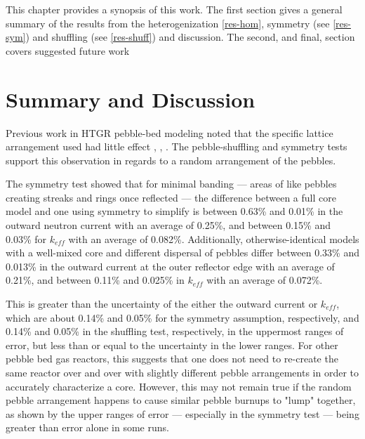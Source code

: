 This chapter provides a synopsis of this work.  The first section gives a general summary of the results from the heterogenization \autoref{res-hom}, symmetry (see \autoref{res-sym}) and shuffling (see \autoref{res-shuff}) and discussion.  The second, and final, section covers suggested future work

\section{Summary and Discussion}

Previous work in HTGR pebble-bed modeling noted that the specific lattice arrangement used had little effect \cite{turkmen_effect_2012}, \cite{karriem_mcnp_2001}, \cite{brown_stochastic_2005}.  The pebble-shuffling and symmetry tests support this observation in regards to a  random arrangement of the pebbles.

The symmetry test showed that for minimal banding --- areas of like pebbles creating streaks and rings once reflected --- the difference between a full core model and one using symmetry to simplify is between 0.63\% and 0.01\% in the outward neutron current with an average of 0.25\%, and between 0.15\% and 0.03\% for $k_{eff}$ with an average of 0.082\%.  Additionally, otherwise-identical models with a well-mixed core and different dispersal of pebbles differ between 0.33\% and 0.013\% in the outward current at the outer reflector edge with an average of 0.21\%, and between 0.11\% and 0.025\% in $k_{eff}$ with an average of 0.072\%.  

This is greater than the uncertainty of the either the outward current or $k_{eff}$, which are about 0.14\% and 0.05\% for the symmetry assumption, respectively, and 0.14\% and 0.05\% in the shuffling test, respectively, in the uppermost ranges of error, but less than or equal to the uncertainty in the lower ranges. For other pebble bed gas reactors, this suggests that one does not need to re-create the same reactor over and over with slightly different pebble arrangements in order to accurately characterize a core.  However, this may not remain true if the random pebble arrangement happens to cause similar pebble burnups to "lump" together, as shown by the upper ranges of error --- especially in the symmetry test --- being greater than error alone in some runs.

